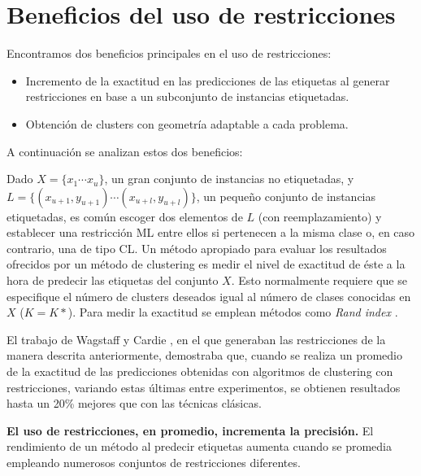 \section{Beneficios del uso de restricciones}

Encontramos dos beneficios principales en el uso de restricciones: 

\begin{itemize}
	
	\item Incremento de la exactitud en las predicciones de las etiquetas al generar restricciones en base a un subconjunto de instancias etiquetadas.
	
	\item Obtención de clusters con geometría adaptable a cada problema.
	
\end{itemize}

A continuación se analizan estos dos beneficios:

Dado $X = \{x_1 \cdots x_u\}$, un gran conjunto de instancias no etiquetadas, y $L = \{(x_{u+1}, y_{u+1})\cdots (x_{u+l}, y_{u+l})\}$, un pequeño conjunto de instancias etiquetadas, es común escoger dos elementos de $L$ (con reemplazamiento) y establecer una restricción \acs{ML} entre ellos si pertenecen a la misma clase o, en caso contrario, una de tipo \acs{CL}. Un método apropiado para evaluar los resultados ofrecidos por un método de clustering es medir el nivel de exactitud de éste a la hora de predecir las etiquetas del conjunto $X$. Esto normalmente requiere que se especifique el número de clusters deseados igual al número de clases conocidas en $X$ ($K = K*$). Para medir la exactitud se emplean métodos como \textit{Rand index} \cite{Rand:1971}.

El trabajo de Wagstaff y Cardie \cite{WagstaffCardie:2000}, en el que generaban las restricciones de la manera descrita anteriormente, demostraba que, cuando se realiza un promedio de la exactitud de las predicciones obtenidas con algoritmos de clustering con restricciones, variando estas últimas entre experimentos, se obtienen resultados hasta un 20\% mejores que con las técnicas clásicas.

\begin{observacion}
	
	\textbf{El uso de restricciones, en promedio, incrementa la precisión.}
	El rendimiento de un método al predecir etiquetas aumenta cuando se promedia empleando numerosos conjuntos de restricciones diferentes. \cite{Survey:2007}
	\label{ob:observacion33}
	
\end{observacion}

